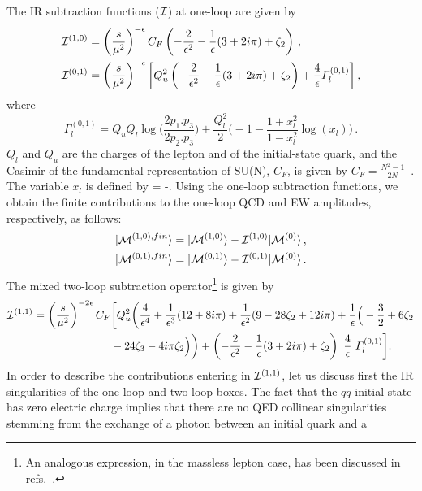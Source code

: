 \documentclass[11pt,a4paper]{article}
\begin{document}
The IR subtraction functions (${\cal I}$) at one-loop are given by
%
%
\begin{align}
\I^{(1,0)} &= \smu^{-\ep} C_F \left( - \frac{2}{\ep^2} - \frac{1}{\ep} (3 + 2 i \pi)  + \zeta_2 \right) \,,
\\
%
\I^{(0,1)} &= \smu^{-\ep} \bigg[ Q_u^2 \left( - \frac{2}{\ep^2} - \frac{1}{\ep} (3 + 2 i \pi)  + \zeta_2 \right)
 + \frac{4}{\ep} {\Gamma}_{l}^{(0,1)} \bigg] \,,
\end{align}
%
where
\begin{equation}
 {\Gamma}_{l}^{(0,1)} = Q_u Q_l \log \bigg( \frac{2 p_1.p_3}{2 p_2.p_3} \bigg)
 + \frac{Q_l^2}{2} \bigg(  -1 - \frac{1+x_l^2}{1-x_l^2} \log (x_l) \bigg) \,.
\end{equation}
%
$Q_l$ and $Q_u$ are the charges of the lepton and of the initial-state quark, and the Casimir of the fundamental representation of SU(N), $C_F$, is given by $C_F=\frac{N^2-1}{2 N}$ \,.
The variable $x_l$ is defined by
\be
  = -\;.
\label{eq:defxl}
\ee
Using the one-loop subtraction functions, we obtain the finite contributions to
the one-loop QCD and EW amplitudes, respectively, as follows:
\begin{align}
 | {\cal M}^{(1,0),fin} \rangle &= | {\cal M}^{(1,0)} \rangle -  {\cal I}^{(1,0)} | {\cal M}^{(0)} \rangle \,,
 \label{eq:QCDfin}\\
 | {\cal M}^{(0,1),fin} \rangle &= | {\cal M}^{(0,1)} \rangle -  {\cal I}^{(0,1)} | {\cal M}^{(0)} \rangle \,.
 \label{eq:EWfin}
\end{align}
%
%
The mixed two-loop subtraction operator\footnote{
An analogous expression, in the massless lepton case, has been discussed in refs.~\cite{Kilgore:2011pa,Kilgore:2013uta}.
  }
is given by
%
\begin{align}
  \I^{(1,1)} = \smu^{-2\ep} C_F &
\bigg[
Q_u^2  \bigg( \frac{4}{\ep^4} + \frac{1}{\ep^3} ( 12 + 8 i \pi ) + \frac{1}{\ep^2} ( 9 - 28 \zeta_2 + 12 i \pi)
+ \frac{1}{\ep} \Big( -\frac{3}{2} + 6 \zeta_2
\nonumber\\&
- 24 \zeta_3 - 4 i \pi \zeta_2 \Big) \bigg)
%
+ \left( - \frac{2}{\ep^2} - \frac{1}{\ep} (3 + 2 i \pi)  + \zeta_2 \right)~\frac{4}{\ep}~\Gamma_l^{(0,1)} \bigg].
\label{eq:i11}
\end{align}
  In order to describe the contributions entering in ${\cal I}^{(1,1)}$,
  let us discuss first the IR singularities of the one-loop and two-loop boxes.
  The fact that the $q\bar q$ initial state has zero electric charge
  implies that there are no QED collinear singularities
  stemming from the exchange of a photon between an initial quark and a
\end{document}

